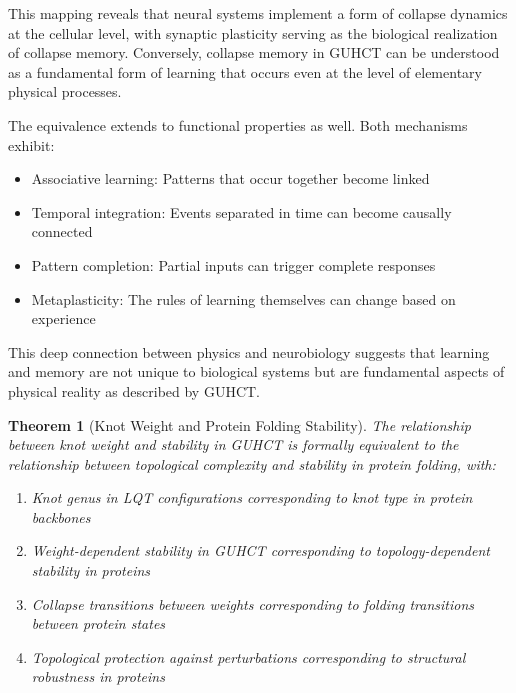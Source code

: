 \documentclass[11pt,a4paper]{article}
\makeatletter
\newtheorem{theorem}{Theorem}[section]
\renewenvironment{proof}[1][\proofname]{\par
  \pushQED{\qed}%
  \normalfont \topsep6\p@\@plus6\p@\relax
  \trivlist
  \item[\hskip\labelsep
        \itshape
    #1\@addpunct{.}]\ignorespaces
}{%
  \popQED\endtrivlist\@endpefalse
}
\makeatother
\begin{document}
\begin{proof}
This mapping reveals that neural systems implement a form of collapse dynamics at the cellular level, with synaptic plasticity serving as the biological realization of collapse memory. Conversely, collapse memory in GUHCT can be understood as a fundamental form of learning that occurs even at the level of elementary physical processes.

The equivalence extends to functional properties as well. Both mechanisms exhibit:
\begin{itemize}
    \item Associative learning: Patterns that occur together become linked
    \item Temporal integration: Events separated in time can become causally connected
    \item Pattern completion: Partial inputs can trigger complete responses
    \item Metaplasticity: The rules of learning themselves can change based on experience
\end{itemize}

This deep connection between physics and neurobiology suggests that learning and memory are not unique to biological systems but are fundamental aspects of physical reality as described by GUHCT.
\end{proof}

\begin{theorem}[Knot Weight and Protein Folding Stability]
\label{thm:knot_protein}
The relationship between knot weight and stability in GUHCT is formally equivalent to the relationship between topological complexity and stability in protein folding, with:
\begin{enumerate}
    \item Knot genus in LQT configurations corresponding to knot type in protein backbones
    \item Weight-dependent stability in GUHCT corresponding to topology-dependent stability in proteins
    \item Collapse transitions between weights corresponding to folding transitions between protein states
    \item Topological protection against perturbations corresponding to structural robustness in proteins
\end{enumerate}
\end{theorem}
\end{document}

